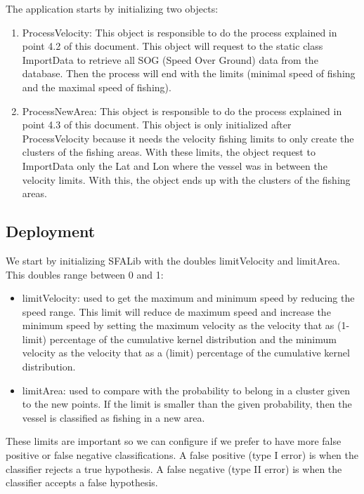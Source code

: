 The application starts by initializing two objects:
\begin{enumerate}
\item    ProcessVelocity: This object is responsible to do the process explained in point 4.2 of this document. This object will request to the static class ImportData to retrieve all SOG (Speed Over Ground) data from the database. Then the process will end with the limits (minimal speed of fishing and the maximal speed of fishing).
\item    ProcessNewArea: This object is responsible to do the process explained in point 4.3 of this document. This object is only initialized after ProcessVelocity because it needs the velocity fishing limits to only create the clusters of the fishing areas. With these limits, the object request to ImportData only the Lat and Lon where the vessel was in between the velocity limits. With this, the object ends up with the clusters of the fishing areas.
\end{enumerate}



\subsection{Deployment} %
\label{sub:deployment}

We start by initializing SFALib with the doubles limitVelocity and limitArea. This doubles range between 0 and 1:
\begin{itemize}
\item limitVelocity: used to get the maximum and minimum speed by reducing the speed range. This limit will reduce de maximum speed and increase the minimum speed by setting the maximum velocity as the velocity that as (1-limit) percentage of the cumulative kernel distribution and the minimum velocity as the velocity that as a (limit) percentage of the cumulative kernel distribution.
\item limitArea: used to compare with the probability to belong in a cluster given to the new points. If the limit is smaller than the given probability, then the vessel is classified as fishing in a new area.
\end{itemize}
These limits are important so we can configure if we prefer to have more false positive or false negative classifications.
A false positive (type I error) is when the classifier rejects a true hypothesis.
A false negative (type II error) is when the classifier accepts a false hypothesis.

